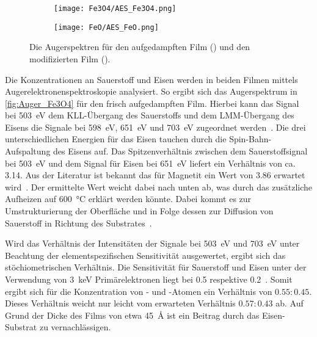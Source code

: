         \begin{figure}
            \centering
            \begin{subfigure}[t]{0.48\textwidth}
                \centering
                \texttt{[image: Fe3O4/AES\_Fe3O4.png]}
                \subcaption{}
                \label{fig:Auger_Fe3O4}
            \end{subfigure}
            \begin{subfigure}[t]{0.48\textwidth}
                \centering
                \texttt{[image: FeO/AES\_FeO.png]}
                \subcaption{}
                \label{fig:Auger_FeO}
            \end{subfigure}
            \caption{Die Augerspektren für den aufgedampften Film () und den modifizierten Film ().}
            \label{fig:Auger}
        \end{figure}
        Die Konzentrationen an Sauerstoff und Eisen werden in beiden Filmen mittels Augerelektronenspektroskopie analysiert.
        So ergibt sich das Augerspektrum in \autoref{fig:Auger_Fe3O4} für den frisch aufgedampften Film.
        Hierbei kann das Signal bei \SI{503}{\electronvolt} dem KLL-Übergang des Sauerstoffs und dem LMM-Übergang des Eisens die Signale bei \SI{598}{\electronvolt}, \SI{651}{\electronvolt} und \SI{703}{\electronvolt} zugeordnet werden~\cite{Auger}. 
        Die drei unterschiedlichen Energien für das Eisen tauchen durch die Spin-Bahn-Aufspaltung des Eisens auf.
        Das Spitzenverhältnis zwischen dem Sauerstoffsignal bei \SI{503}{\electronvolt} und dem Signal für Eisen bei \SI{651}{\electronvolt} liefert ein Verhältnis von ca. \num{3.14}.
        Aus der Literatur ist bekannt das für Magnetit ein Wert von \num{3.86} erwartet wird~\cite{FeO_1}.
        Der ermittelte Wert weicht dabei nach unten ab, was durch das zusätzliche Aufheizen auf \SI{600}{\celsius} erklärt werden könnte.
        Dabei kommt es zur Umstrukturierung der Oberfläche und in Folge dessen zur Diffusion von Sauerstoff in Richtung des Substrates~\cite{FeO_62}.

        Wird das Verhältnis der Intensitäten der Signale bei \SI{503}{\electronvolt} und \SI{703}{\electronvolt} unter Beachtung der elementspezifischen Sensitivität ausgewertet, ergibt sich das stöchiometrischen Verhältnis.
        Die Sensitivität für Sauerstoff und Eisen unter der Verwendung von \SI{3}{\kilo\electronvolt} Primärelektronen liegt bei \num{0.5} respektive \num{0.2}~\cite{Auger}.
        Somit ergibt sich für die Konzentration von - und -Atomen ein Verhältnis von $\num{0.55}:\num{0.45}$.
        Dieses Verhältnis weicht nur leicht vom erwarteten Verhältnis $\num{0.57}:\num{0.43}$ ab.
        Auf Grund der Dicke des Films von etwa \SI{45}{\angstrom} ist ein Beitrag durch das Eisen-Substrat zu vernachlässigen.

